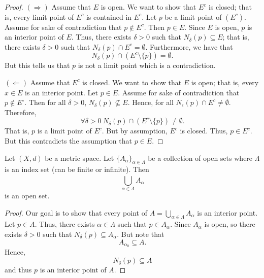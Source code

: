 \documentclass[a4paper]{report}
\begin{document}
\begin{proof}
\( (\Longrightarrow) \) Assume that \( E  \) is open. We want to show that \( E^{c} \) is closed; that is, every limit point of \( E^{c} \) is contained in \( E^{c} \). Let \( p  \) be a limit point of \( (E^{c}) \). Assume for sake of contradiction that \( p \notin E^{c} \). Then \( p \in E  \). Since \( E  \) is open, \( p  \) is an interior point of \( E  \). Thus, there exists \( \delta > 0  \) such that \( {N}_{\delta}(p) \subseteq E  \); that is, there exists \( \delta > 0  \) such that \( {N}_{\delta}(p) \cap E^{c} = \emptyset \). Furthermore, we have that 
\[  {N}_{\delta}(p) \cap (E^{c} \setminus  \{ p \} ) = \emptyset. \]
But this tells us that \( p \) is not a limit point which is a contradiction.

\( (\Longleftarrow) \) Assume that \( E^{c} \) is closed. We want to show that \( E  \) is open; that is, every \( x \in E  \) is an interior point. Let \( p \in E  \). Assume for sake of contradiction that \( p \notin E^{\circ} \). Then for all \( \delta > 0  \), \( {N}_{\delta}(p) \not\subseteq E\). Hence, for all \( {N}_{\epsilon}(p) \cap E^{c} \neq \emptyset \). Therefore, 
\[  \forall \delta > 0 \ {N}_{\delta} (p) \cap (E^{c} \setminus  \{ p \} ) \neq \emptyset. \]
That is, \( p  \) is a limit point of \( E^{c} \). But by assumption, \( E^{c} \) is closed. Thus, \( p \in E^{c} \). But this contradicts the assumption that \( p \in E  \).
\end{proof}

\begin{theorem}[ ]
    Let \( (X,d) \) be a metric space. Let \( \{ {A}_{\alpha} \}_{\alpha \in \Lambda} \) be a collection of open sets where \( \Lambda  \) is an index set (can be finite or infinite). Then     
    \[  \bigcup_{ \alpha \in \Lambda }^{  }  {A}_{\alpha} \]
    is an open set.
\end{theorem}
\begin{proof}
Our goal is to show that every point of \( A =  \bigcup_{ \alpha \in \Lambda }^{  } {A}_{\alpha}  \) is an interior point. Let \( p \in A   \). Thus, there exists \( \alpha \in \Lambda \) such that \( p \in {A}_{\alpha} \). Since \( {A}_{\alpha} \) is open, so there exists \( \delta > 0  \) such that \( {N}_{\delta}(p) \subseteq  {A}_{\alpha} \). But note that 
\[  {A}_{{\alpha}_{0}} \subseteq  A.  \]
Hence, 
\[  {N}_{\delta}(p) \subseteq A  \]
and thus \( p  \) is an interior point of \( A  \).

\end{proof}
\end{document}
